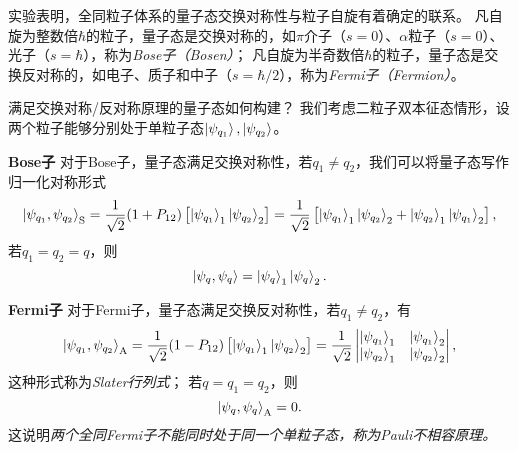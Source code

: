 实验表明，全同粒子体系的量子态交换对称性与粒子自旋有着确定的联系。
凡自旋为整数倍$\hbar$的粒子，量子态是交换对称的，如$\pi$介子（$s=0$）、$\alpha$粒子（$s=0$）、光子（$s=\hbar$），称为\emph{Bose子（Bosen）}；
凡自旋为半奇数倍$\hbar$的粒子，量子态是交换反对称的，如电子、质子和中子（$s=\hbar/2$），称为\emph{Fermi子（Fermion）}。

满足交换对称/反对称原理的量子态如何构建？
我们考虑二粒子双本征态情形，设两个粒子能够分别处于单粒子态$\ket{\psi_{q_1}},\ket{\psi_{q_2}}$。

\begin{tcolorbox}
\textbf{Bose子}\quad
对于Bose子，量子态满足交换对称性，若$q_1\neq q_2$，我们可以将量子态写作归一化对称形式
\begin{equation}
    \ket{\psi_{q_1},\psi_{q_2}}_{\mathrm{S}}
    = \frac{1}{\sqrt{2}} (1+P_{12}) \left[\ket{\psi_{q_1}}_1 \ket{\psi_{q_2}}_2\right]
    = \frac{1}{\sqrt{2}} \left[\ket{\psi_{q_1}}_1 \ket{\psi_{q_2}}_2 + \ket{\psi_{q_2}}_1 \ket{\psi_{q_1}}_2\right],
\end{equation}
若$q_1=q_2=q$，则
\begin{equation}
    \ket{\psi_{q},\psi_{q}} = \ket{\psi_q}_1 \ket{\psi_q}_2.
\end{equation}
\end{tcolorbox}

\begin{tcolorbox}
\textbf{Fermi子}\quad
对于Fermi子，量子态满足交换反对称性，若$q_1\neq q_2$，有
\begin{equation}
    \ket{\psi_{q_1},\psi_{q_2}}_{\mathrm{A}}
    = \frac{1}{\sqrt{2}} (1-P_{12}) \left[\ket{\psi_{q_1}}_1 \ket{\psi_{q_2}}_2\right]
    = \frac{1}{\sqrt{2}}
    \begin{vmatrix}
        \ket{\psi_{q_1}}_1 & \ket{\psi_{q_1}}_2 \\
        \ket{\psi_{q_2}}_1 & \ket{\psi_{q_2}}_2
    \end{vmatrix},
\end{equation}
这种形式称为\emph{Slater行列式}；
若$q=q_1=q_2$，则
\begin{equation}
    \ket{\psi_q,\psi_q}_{\mathrm{A}} = 0.
\end{equation}
这说明\emph{两个全同Fermi子不能同时处于同一个单粒子态，称为Pauli不相容原理。}
\end{tcolorbox}


